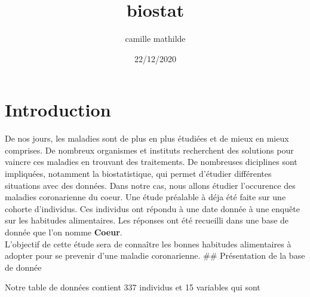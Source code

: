\documentclass[
]{article}
\title{biostat}
\author{camille mathilde}
\date{22/12/2020}
\begin{document}
\maketitle

\newpage

\hypertarget{introduction}{%
\section{Introduction}\label{introduction}}

De nos jours, les maladies sont de plus en plus étudiées et de mieux en
mieux comprises. De nombreux organismes et instituts recherchent des
solutions pour vaincre ces maladies en trouvant des traitements. De
nombreuses diciplines sont impliquées, notamment la biostatistique, qui
permet d'étudier différentes situations avec des données. Dans notre
cas, nous allons étudier l'occurence des maladies coronarienne du coeur.
Une étude préalable à déja été faite sur une cohorte d'individus. Ces
individus ont répondu à une date donnée à une enquête sur les habitudes
alimentaires. Les réponses ont été recueilli dans une base de donnée que
l'on nomme \textbf{Coeur}.\\
L'objectif de cette étude sera de connaître les bonnes habitudes
alimentaires à adopter pour se prevenir d'une maladie coronarienne.
\newpage \tableofcontents \newpage \#\# Présentation de la base de
donnée

Notre table de données contient 337 individus et 15 variables qui sont
\end{document}
